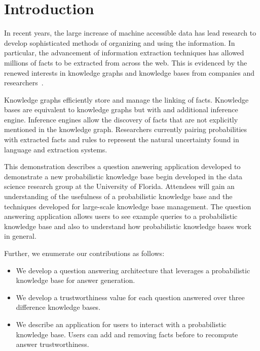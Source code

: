 

\section{Introduction}


In recent years, the large increase of machine accessible data has lead research
to develop sophisticated methods of organizing and using the information.
In particular, the advancement of information extraction techniques has allowed
millions of facts to be extracted from across the web.
This is evidenced by the renewed interests in knowledge graphs and knowledge bases
from companies and
researchers~\cite{bellare2013woo,chang2014typed,dong2014knowledge,niu2012deepdive}.

Knowledge graphs efficiently store and manage the linking of facts.
Knowledge bases are equivalent to knowledge graphs but with and additional
inference engine. 
Inference engines allow the discovery of facts that are not explicitly
mentioned in the knowledge graph.
Researchers currently pairing probabilities with extracted facts and rules to
represent the natural uncertainty found in language and extraction systems.

This demonstration describes a question answering application developed to demonstrate
a new probabilistic knowledge base begin developed in the data science research group at the University of Florida.
Attendees will gain an understanding of the usefulness of a probabilistic
knowledge base and the techniques developed for large-scale knowledge base
management.
The question answering application allows users to see example queries to a
probabilistic knowledge base and also to understand how probabilistic knowledge bases work in general.

Further, we enumerate our contributions as follows:
\begin{itemize}
\vspace{-0.5em}
\item We develop a question answering architecture that leverages a probabilistic knowledge base for answer generation.

\vspace{-0.5em}
\item We develop a trustworthiness value for each question answered over three difference knowledge bases.

\vspace{-0.5em}
\item We describe an application for users to interact with a probabilistic knowledge
base. Users can add and removing facts before to recompute answer
trustworthiness.
\end{itemize}

